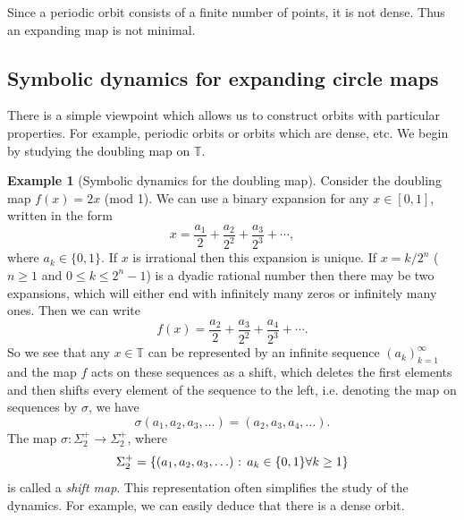 \documentclass[12pt]{article}
\theoremstyle{definition}
\newtheorem{example}[theorem]{Example}
\theoremstyle{remark}
\begin{document}
Since a periodic orbit consists of a finite number of points, it is not dense. Thus an expanding
map is not minimal.

\subsection{Symbolic dynamics for expanding circle maps}

There is a simple viewpoint which allows us to construct orbits with particular properties. For
example, periodic orbits or orbits which are dense, etc. We begin by studying the doubling map
on $\mathbb T$.

\begin{example}[Symbolic dynamics for the doubling map]
Consider the  doubling map
$f(x) = 2x$ (mod 1). We can use a binary expansion for any $x \in [0,1]$, written in the form
\[
x = \frac{a_1}{2} + \frac{a_2}{2^2} + \frac{a_3}{2^3} + \cdots,
\]
where $a_k \in \{0,1\}$. If $x$ is irrational then this expansion is unique. If $x = k/2^n$ ($n \ge 1$ and
$0 \le k \le 2^n -1$) is a dyadic rational number then there may be two expansions, which will either
end with infinitely many zeros or infinitely many ones. Then we can write
\[
f(x) = \frac{a_2}{2} + \frac{a_3}{2^2} + \frac{a_4}{2^3} + \cdots .
\]
So we see that any $x \in \mathbb T$ can be represented by an infinite sequence $(a_k)_{k=1}^\infty$
and the map $f$ acts
on these sequences as a shift, which deletes the first elements and then shifts every element of
the sequence to the left, i.e. denoting the map on sequences by $\sigma$, we have
\[
\sigma(a_1,a_2,a_3,\ldots) = (a_2,a_3,a_4,\ldots).
\]
The map $\sigma : \Sigma_2^+ \to \Sigma_2^+$, where
\[
\Sigma_2^+ = \left\{(a_1,a_2,a_3,\ldots) \hbox{ : } a_k \in \{0,1\} \forall k \ge 1\right\}
\]
is called a {\it shift map}. This representation often simplifies the study of the dynamics. For
example, we can easily deduce that there is a dense orbit.


\end{example}
\end{document}

